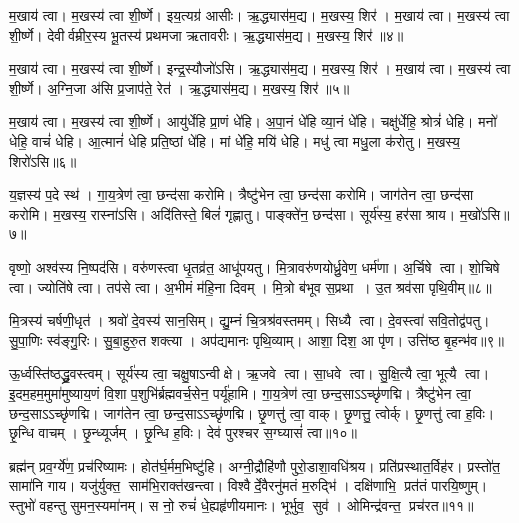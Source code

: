 म॒खाय॑ त्वा। 
म॒खस्य॑ त्वा शी॒र्ष्णे। 
इय॒त्यग्र॑ आसीः। 
ऋ॒द्ध्यास॑म॒द्य। 
म॒खस्य॒ शिर॑। 
म॒खाय॑ त्वा। 
म॒खस्य॑ त्वा शी॒र्ष्णे। 
देवीर्वम्रीर॒स्य भू॒तस्य॑ प्रथमजा ऋतावरीः। 
ऋ॒द्ध्यास॑म॒द्य। 
म॒खस्य॒ शिर॑॥४॥

म॒खाय॑ त्वा। 
म॒खस्य॑ त्वा शी॒र्ष्णे। 
इन्द्र॒स्यौजो॑ऽसि। 
ऋ॒द्ध्यास॑म॒द्य। 
म॒खस्य॒ शिर॑। 
म॒खाय॑ त्वा। 
म॒खस्य॑ त्वा शी॒र्ष्णे। 
अ॒ग्नि॒जा अ॑सि प्र॒जाप॑ते॒ रेत॑। 
ऋ॒द्ध्यास॑म॒द्य। 
म॒खस्य॒ शिर॑॥५॥

म॒खाय॑ त्वा। 
म॒खस्य॑ त्वा शी॒र्ष्णे। 
आयु॑र्धेहि प्रा॒णं धे॑हि। 
अ॒पा॒नं धे॑हि व्या॒नं धे॑हि। 
चक्षु॑र्धेहि॒ श्रोत्रं॑ धेहि। 
मनो॑ धेहि॒ वाचं॑ धेहि। 
आ॒त्मानं॑ धेहि प्रति॒ष्ठां धे॑हि। 
मां धे॑हि॒ मयि॑ धेहि। 
मधु॑ त्वा मधु॒ला क॑रोतु। 
म॒खस्य॒ शिरो॑ऽसि॥६॥

य॒ज्ञस्य॑ प॒दे स्थ॑। 
गा॒य॒त्रेण॑ त्वा॒ छन्द॑सा करोमि। 
त्रैष्टु॑भेन त्वा॒ छन्द॑सा करोमि। 
जाग॑तेन त्वा॒ छन्द॑सा करोमि। 
म॒खस्य॒ रास्ना॑ऽसि। 
अदि॑तिस्ते॒ बिलं॑ गृह्णातु। 
पाङ्क्ते॑न॒ छन्द॑सा। 
सूर्य॑स्य॒ हर॑सा श्राय। 
म॒खो॑ऽसि॥७॥
\anuvakamend[प॒ते॒ शिर॑ ऋतावरीर्\mbox{}ऋ॒द्ध्यास॑म॒द्य म॒खस्य॒ शिर॒ शिर॒ शिरो॑ऽसि॒ नव॑ च%
]

वृष्णो॒ अश्व॑स्य नि॒ष्पद॑सि। 
वरु॑णस्त्वा धृ॒तव्र॑त॒ आधू॑पयतु। 
मि॒त्रावरु॑णयोर्ध्रु॒वेण॒ धर्म॑णा। 
अ॒र्चिषे त्वा। 
शो॒चिषे त्वा। 
ज्योति॑षे त्वा। 
तप॑से त्वा। 
अ॒भीमं म॑हि॒ना दिवम्। 
मि॒त्रो ब॑भूव स॒प्रथा। 
उ॒त श्रव॑सा पृथि॒वीम्॥८॥

मि॒त्रस्य॑ चर्\mbox{}षणी॒धृत॑। 
श्रवो॑ दे॒वस्य॑ सान॒सिम्। 
द्यु॒म्नं चि॒त्रश्र॑वस्तमम्। 
सिध्यै त्वा। 
दे॒वस्त्वा॑ सवि॒तोद्व॑पतु। 
सु॒पा॒णिः स्व॑ङ्गु॒रिः। 
सु॒बा॒हुरु॒त शक्त्या। 
अप॑द्यमानः पृथि॒व्याम्। 
आशा॒ दिश॒ आ पृ॑ण। 
उत्ति॑ष्ठ बृ॒हन्भ॑व॥९॥

ऊ॒र्ध्वस्ति॑ष्ठद्ध्रु॒वस्त्वम्। 
सूर्य॑स्य त्वा॒ चक्षु॒षाऽन्वीक्षे। 
ऋ॒जवे त्वा। 
सा॒धवे त्वा। 
सु॒क्षि॒त्यै त्वा॒ भूत्यै त्वा। 
इ॒दम॒हम॒मुमा॑\-मुष्याय॒णं  वि॒शा प॒शुभि॑र्ब्रह्मवर्च॒सेन॒ पर्यू॑हामि। 
गा॒य॒त्रेण॑ त्वा॒ छन्द॒साऽऽच्छृ॑णद्मि। 
त्रैष्टु॑भेन त्वा॒ छन्द॒साऽऽच्छृ॑णद्मि। 
जाग॑तेन त्वा॒ छन्द॒साऽऽच्छृ॑णद्मि। 
छृ॒णत्तु॑ त्वा॒ वाक्। 
छृ॒णत्तु॒ त्वोर्क्। 
छृ॒णत्तु॑ त्वा ह॒विः। 
छृ॒न्धि वाचम्। 
छृ॒न्ध्यूर्जम्। 
छृ॒न्धि ह॒विः। 
देव॑ पुरश्चर स॒ग्घ्यासं॑ त्वा॥१०॥
\anuvakamend[पृ॒थि॒वीं भ॑व॒ वाख्षट्च॑]

ब्रह्म॑न् प्रव॒र्ग्ये॑ण॒ प्रच॑रिष्यामः। 
होत॑र्घ॒र्मम॒भिष्टु॑हि। 
अग्नी॒द्रौहि॑णौ पुरो॒डाशा॒वधि॑श्रय। 
प्रति॑प्रस्थात॒र्विह॑र। 
प्रस्तो॑त॒ सामा॑नि गाय। 
यजु॑र्\mbox{}युक्त॒ साम॑भि॒राक्त॑खन्त्वा। 
विश्वैर्दे॒वैरनु॑मतं म॒रुद्भि॑। 
दक्षि॑णाभि॒ प्रत॑तं पारयि॒ष्णुम्। 
स्तुभो॑ वहन्तु सुमन॒स्यमा॑नम्। 
स नो॒ रुचं॑ धे॒ह्यहृ॑णीयमानः। 
भूर्भुव॒ सुव॑। 
ओमिन्द्र॑वन्त॒ प्रच॑रत॥११॥
\anuvakamend[अहृ॑णीयमानो॒ द्वे च॑]

